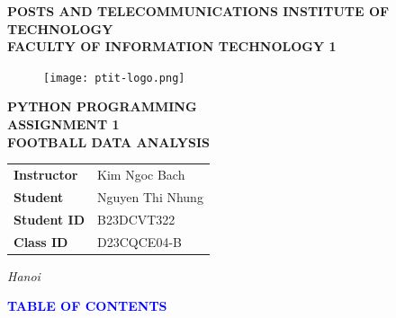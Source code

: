 \documentclass[a4paper,12pt]{article}
\begin{document}
\fontsize{14pt}{16pt}\selectfont
\begin{titlepage}
\begin{center}
 

\vspace*{0.5cm}
\textbf{POSTS AND TELECOMMUNICATIONS INSTITUTE OF TECHNOLOGY}\\[0.2cm]
\textbf{FACULTY OF INFORMATION TECHNOLOGY 1}\\[1.5cm]
\begin{figure}[h]
    \centering
    \texttt{[image: ptit-logo.png]}
\end{figure}
\textbf{\Large PYTHON PROGRAMMING}\\[0.5cm]
\textbf{ASSIGNMENT 1}\\[0.5cm]
\textbf{\LARGE FOOTBALL DATA ANALYSIS}\\[3cm]



{\Large
\begin{center}
\begin{tabular}{ll}
\textbf{Instructor} & Kim Ngoc Bach \\
\textbf{Student} & Nguyen Thi Nhung \\
\textbf{Student ID} & B23DCVT322 \\
\textbf{Class ID} & D23CQCE04-B \\
\end{tabular}
\end{center}
}

\vfill
\textit{Hanoi}

\end{center}
\end{titlepage}

\newpage
\begin{center}
    \textcolor{blue}{\textbf{\Large TABLE OF CONTENTS}}
\end{center}
\end{document}
